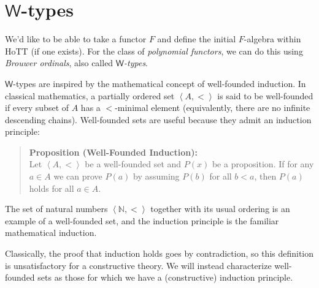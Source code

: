 \documentclass[11pt]{article}
\newcommand*{\W}{\mathsf{W}}
\begin{document}
\section{$\W$-types}
We'd like to be able to take a functor $F$ and define the initial $F$-algebra within HoTT (if one exists). For the class of \emph{polynomial functors}, we can do this using \emph{Brouwer ordinals}, also called \emph{$\W$-types}.

$\W$-types are inspired by the mathematical concept of well-founded induction. In classical mathematics, a partially ordered set $\left< A, < \right>$ is said to be well-founded if every subset of $A$ has a $<$-minimal element (equivalently, there are no infinite descending chains). Well-founded sets are useful because they admit an induction principle:
\begin{quote}
  \textbf{Proposition (Well-Founded Induction):} \\
  Let $\left<A , <\right>$ be a well-founded set and $P(x)$ be a proposition. If for any $a \in A$ we can prove $P(a)$ by assuming $P(b)$ for all $b < a$, then $P(a)$ holds for all $a \in A$.
\end{quote}
The set of natural numbers $\left< \mathbb{N}, <\right>$ together with its usual ordering is an example of a well-founded set, and the induction principle is the familiar mathematical induction.

Classically, the proof that induction holds goes by contradiction, so this definition is unsatisfactory for a constructive theory. We will instead characterize well-founded sets as those for which we have a (constructive) induction principle.
\end{document}

